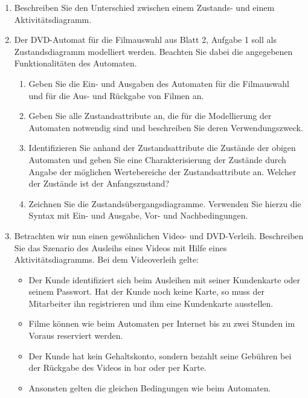 \documentclass{lehramt-informatik-haupt}
\begin{document}
\begin{enumerate}
\item Beschreiben Sie den Unterschied zwischen einem Zustands- und einem
Aktivitätsdiagramm.

\item Der DVD-Automat für die Filmauswahl aus Blatt 2, Aufgabe 1 soll
als Zustandsdiagramm modelliert werden. Beachten Sie dabei die
angegebenen Funktionalitäten des Automaten.

\begin{enumerate}
\item Geben Sie die Ein- und Ausgaben des Automaten für die Filmauswahl
und für die Aus- und Rückgabe von Filmen an.

\item Geben Sie alle Zustandsattribute an, die für die Modellierung der
Automaten notwendig sind und beschreiben Sie deren Verwendungszweck.

\item Identifizieren Sie anhand der Zustandsattribute die Zustände der
obigen Automaten und geben Sie eine Charakterisierung der Zustände durch
Angabe der möglichen Wertebereiche der Zustandsattribute an. Welcher der
Zustände ist der Anfangszustand?

\item Zeichnen Sie die Zustandsübergangsdiagramme. Verwenden Sie hierzu
die Syntax mit Ein- und Ausgabe, Vor- und Nachbedingungen.
\end{enumerate}

\item Betrachten wir nun einen gewöhnlichen Video- und DVD-Verleih.
Beschreiben Sie das Szenario des Ausleihs eines Videos mit Hilfe eines
Aktivitätsdiagramms. Bei dem Videoverleih gelte:

\begin{itemize}
\item Der Kunde identifiziert sich beim Ausleihen mit seiner Kundenkarte
oder seinem Passwort. Hat der Kunde noch keine Karte, so muss der
Mitarbeiter ihn registrieren und ihm eine Kundenkarte ausstellen.

\item Filme können wie beim Automaten per Internet bis zu zwei Stunden
im Voraus reserviert werden.

\item Der Kunde hat kein Gehaltskonto, sondern bezahlt seine Gebühren
bei der Rückgabe des Videos in bar oder per Karte.

\item Ansonsten gelten die gleichen Bedingungen wie beim Automaten.
\end{itemize}
\end{enumerate}
\end{document}
